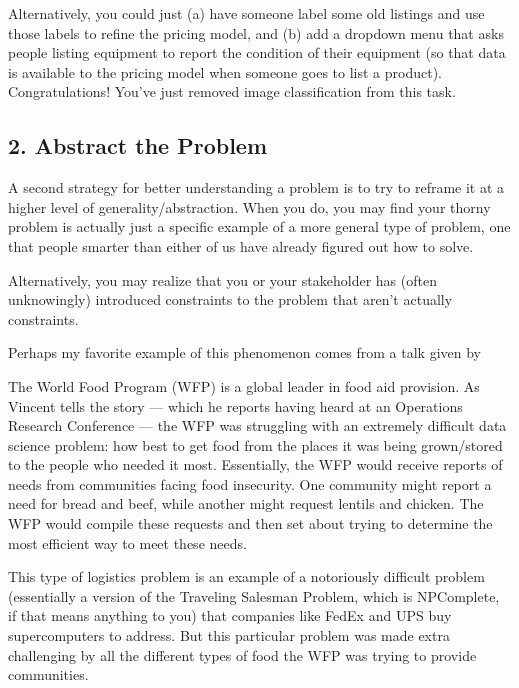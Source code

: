 \documentclass[letterpaper,10pt,english]{jupyterBook}
\begin{document}
\sphinxAtStartPar
Alternatively, you could just (a) have someone label some old listings and use those labels  to refine the pricing model, and (b) add a drop\sphinxhyphen{}down menu that asks people listing equipment to report the condition of their equipment (so that data is available to the pricing model when someone goes to list a product). Congratulations! You’ve just  removed image classification from this task.


\subsection{2. Abstract the Problem}
\label{\detokenize{20_problems_to_questions/10_solving_the_right_problem:abstract-the-problem}}
\sphinxAtStartPar
A second strategy for better understanding a problem is to try to reframe it at a higher level of generality/abstraction. When you do, you may find your thorny problem is actually just a specific example of a more general type of problem, one that people smarter than either of us have already figured out how to solve.

\sphinxAtStartPar
Alternatively, you may realize that you or your stakeholder has (often unknowingly) introduced constraints to the problem that aren’t actually constraints.

\sphinxAtStartPar
Perhaps my favorite example of this phenomenon comes from a talk given by 

\sphinxAtStartPar
The World Food Program (WFP) is a global leader in food aid provision. As Vincent tells the story — which he reports having heard at an Operations Research Conference — the WFP was struggling with an extremely difficult data science problem: how best to get food from the places it was being grown/stored to the people who needed it most. Essentially, the WFP would receive reports of needs from communities facing food insecurity. One community might report a need for bread and beef, while another might request lentils and chicken. The WFP would compile these requests and then set about trying to determine the most efficient way to meet these needs.

\sphinxAtStartPar
This type of logistics problem is an example of a notoriously difficult problem (essentially a version of the Traveling Salesman Problem, which is NP\sphinxhyphen{}Complete, if that means anything to you) that companies like FedEx and UPS buy supercomputers to address. But this particular problem was made extra challenging by all the different types of food the WFP was trying to provide communities.
\end{document}
